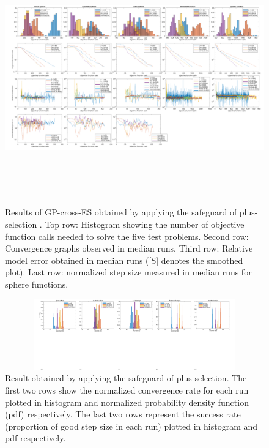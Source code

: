 \begin{center}
\begin{figure}
\includegraphics[height=4.3in, width=6.1in]{merged_plot_emergency_v4_final.pdf}
\caption{Results of GP-cross-ES obtained by applying the safeguard of plus-selection . Top row: Histogram showing the number of objective function calls needed to solve the five test problems. Second row: Convergence graphs observed in median runs. Third row: Relative model error obtained in median runs ([S] denotes the smoothed plot). Last row: normalized step size measured in median runs for sphere functions. }
\label{fig:merged_plot_GP-cross-ES}
\end{figure}
\end{center}


\begin{center}
\begin{figure}
\includegraphics[height=1.2in, width=6in]{success_emergency_v3_final.pdf}
\caption{Result obtained by applying the safeguard of plus-selection. The first two rows show the normalized convergence rate for each run plotted in histogram and normalized probability density function (pdf) respectively. The last two rows represent the success rate (proportion of good step size in each run) plotted in histogram and pdf respectively. 
}
\label{fig:success_convergence_emergency}
\end{figure}
\end{center}


